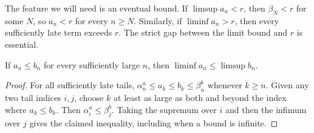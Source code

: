 The feature we will need is an eventual bound. If $\limsup a_n<r$,
then $\beta_N<r$ for some $N$, so $a_n<r$ for every $n\ge N$.
Similarly, if $\liminf a_n>r$, then every sufficiently late term
exceeds $r$. The strict gap between the limit bound and $r$ is essential.

\begin{proposition}
  If $a_n\le b_n$ for every sufficiently large $n$, then
  $\liminf a_n\le\limsup b_n$.
\end{proposition}

\begin{proof}
  For all sufficiently late tails, $\alpha_n^{a}\le a_k\le b_k
  \le\beta_n^{b}$ whenever $k\ge n$. Given any two tail indices
  $i,j$, choose $k$ at least as large as both and beyond the index
  where $a_k\le b_k$. Then $\alpha_i^{a}\le\beta_j^{b}$.
  Taking the supremum over $i$ and then the infimum over $j$ gives
  the claimed inequality, including when a bound is infinite.
\end{proof}
